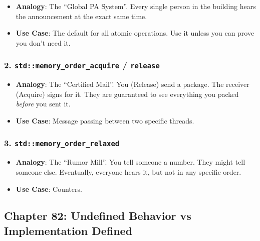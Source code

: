 \begin{itemize}
\tightlist
\item
  \textbf{Analogy}: The ``Global PA System''. Every single person in the
  building hears the announcement at the exact same time.
\item
  \textbf{Use Case}: The default for all atomic operations. Use it
  unless you can prove you don't need it.
\end{itemize}

\hypertarget{stdmemory_order_acquire-release}{%
\subsubsection{\texorpdfstring{2. \texttt{std::memory\_order\_acquire} /
\texttt{release}}{2. std::memory\_order\_acquire / release}}\label{stdmemory_order_acquire-release}}

\begin{itemize}
\tightlist
\item
  \textbf{Analogy}: The ``Certified Mail''. You (Release) send a
  package. The receiver (Acquire) signs for it. They are guaranteed to
  see everything you packed \emph{before} you sent it.
\item
  \textbf{Use Case}: Message passing between two specific threads.
\end{itemize}

\hypertarget{stdmemory_order_relaxed}{%
\subsubsection{\texorpdfstring{3.
\texttt{std::memory\_order\_relaxed}}{3. std::memory\_order\_relaxed}}\label{stdmemory_order_relaxed}}

\begin{itemize}
\tightlist
\item
  \textbf{Analogy}: The ``Rumor Mill''. You tell someone a number. They
  might tell someone else. Eventually, everyone hears it, but not in any
  specific order.
\item
  \textbf{Use Case}: Counters.
\end{itemize}

\hypertarget{chapter-82-undefined-behavior-vs-implementation-defined}{%
\subsection{Chapter 82: Undefined Behavior vs Implementation
Defined}\label{chapter-82-undefined-behavior-vs-implementation-defined}}

